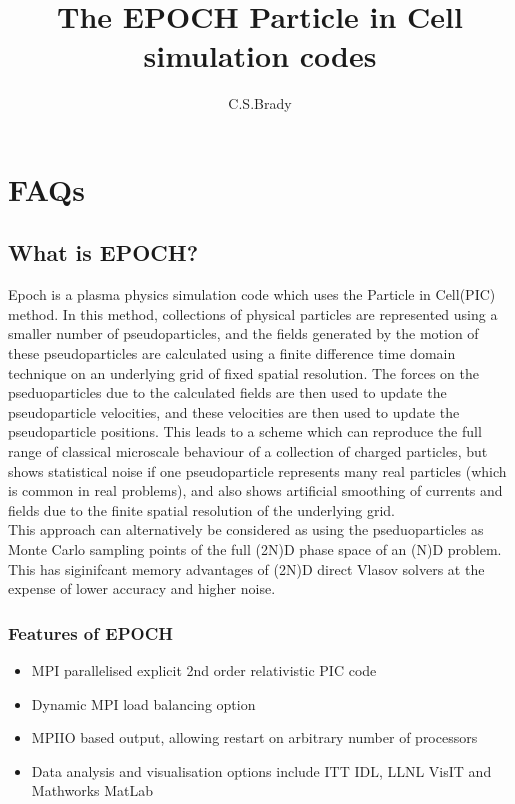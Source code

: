 \documentclass[12pt]{article}
\begin{document}
 

\title{The EPOCH Particle in Cell simulation codes}
\author{C.S.Brady}
\maketitle
\tableofcontents
\newpage

\section{FAQs}
\subsection{What is EPOCH?}
Epoch is a plasma physics simulation code which uses the Particle in Cell(PIC) method. In this method, collections of physical particles are represented using a smaller number of pseudoparticles, and the fields generated by the motion of these pseudoparticles are calculated using a finite difference time domain technique on an underlying grid of fixed spatial resolution. The forces on the pseduoparticles due to the calculated fields are then used to update the pseudoparticle velocities, and these velocities are then used to update the pseudoparticle positions. This leads to a scheme which can reproduce the full range of classical microscale behaviour of a collection of charged particles, but shows statistical noise if one pseudoparticle represents many real particles (which is common in real problems), and also shows artificial smoothing of currents and fields due to the finite spatial resolution of the underlying grid.\\
This approach can alternatively be considered as using the pseduoparticles as Monte Carlo sampling points of the full (2N)D phase space of an (N)D problem. This has siginifcant memory advantages of (2N)D direct Vlasov solvers at the expense of lower accuracy and higher noise.
\subsubsection{Features of EPOCH}
\begin{itemize}
\item MPI parallelised explicit 2nd order relativistic PIC code
\item Dynamic MPI load balancing option
\item MPIIO based output, allowing restart on arbitrary number of processors
\item Data analysis and visualisation options include ITT IDL, LLNL VisIT and Mathworks MatLab
\end{itemize}
\end{document}
